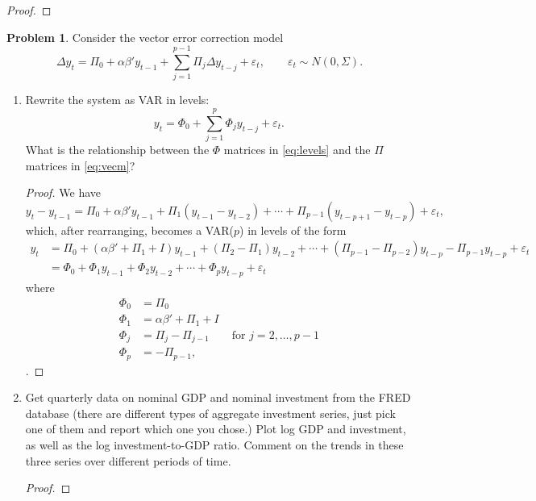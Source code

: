 \documentclass[oneside,reqno]{amsart}
\newcommand{\eps}{\varepsilon}
\theoremstyle{definition}
\newtheorem{prob}{Problem}
\begin{document}
\begin{enumerate}[label=(\roman*)]
\begin{proof}
\end{proof}
\end{enumerate}


\begin{prob}
Consider the vector error correction model
\begin{equation}\label{eq:vecm}
	\Delta y_t = \Pi_0 + \alpha \beta' y_{t-1} + \sum_{j=1}^{p-1} \Pi_j \Delta y_{t-j} + \eps_t, 
	\qquad \eps_t \sim N(0, \Sigma).
\end{equation}
\end{prob}

\begin{enumerate}[label=(\roman*)]
\item
Rewrite the system as VAR in levels:
\begin{equation}\label{eq:levels}
	y_t = \Phi_0 + \sum_{j=1}^p \Phi_j y_{t-j} + \eps_t.
\end{equation}
What is the relationship between the $\Phi$ matrices in \eqref{eq:levels} and the $\Pi$ matrices in \eqref{eq:vecm}?
\begin{proof}
We have
\[
	y_t - y_{t-1} = \Pi_0 + \alpha \beta' y_{t-1} + \Pi_1 (y_{t-1}  - y_{t-2}) +  \cdots  + \Pi_{p-1} (y_{t-p+1}  - y_{t-p}) + \eps_t,
\]
which, after rearranging, becomes a VAR($p$) in levels of the form
\begin{align*}
	y_t  &= \Pi_0 +  (\alpha \beta' + \Pi_1 + I)y_{t-1}  +(\Pi_2 - \Pi_1) y_{t-2} + \cdots + (\Pi_{p-1} - \Pi_{p-2})  y_{t-p} - \Pi_{p-1}y_{t-p} + \eps_t \\
	&= \Phi_0 +  \Phi_1 y_{t-1}  + \Phi_2 y_{t-2} + \cdots + \Phi_p y_{t-p} + \eps_t
\end{align*}
where 
\begin{align*}
	\Phi_0 &= \Pi_0 \\
	\Phi_1 &=  \alpha \beta' + \Pi_1 + I \\
	\Phi_j &= \Pi_j - \Pi_{j-1} \qquad \text{for } j = 2,\dotsc, p-1 \\
	\Phi_p &= - \Pi_{p-1},
\end{align*} 
.
\end{proof}
\item
Get quarterly data on nominal GDP and nominal investment from the
FRED database (there are different types of aggregate investment series,
just pick one of them and report which one you chose.) Plot log GDP
and investment, as well as the log investment-to-GDP ratio. Comment
on the trends in these three series over different periods of time.
\begin{proof}

\end{proof}
\end{enumerate}
\end{document}
